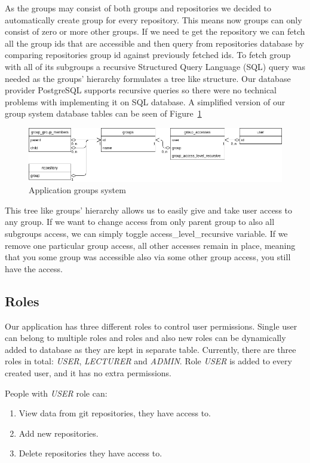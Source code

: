 As the groups may consist of both groups and repositories we decided to automatically create group for every repository.
This means now groups can only consist of zero or more other groups.
If we need te get the repository we can fetch all the group ids that are accessible and then query from repositories database by
comparing repositories group id against previously fetched ids.
To fetch group with all of its subgroups a recursive Structured Query Language (SQL) query was needed as the groups'
hierarchy formulates a tree like structure.
Our database provider PostgreSQL supports recursive queries so there were no technical problems with implementing it on SQL database.
A simplified version of our group system database tables can be seen of Figure~\ref{fig:group-system}

\begin{figure}[h]
    \includegraphics[width=\textwidth]{figures/group_system}
    \caption{Application groups system}
    \label{fig:group-system}
\end{figure}

This tree like groups' hierarchy allows us to easily give and take user access to any group.
If we want to change access from only parent group to also all subgroups access, we can simply toggle access{\_}level{\_}recursive
variable.
If we remove one particular group access, all other accesses remain in place, meaning that you some group was accessible
also via some other group access, you still have the access.

\subsection{Roles}\label{subsec:roles}
Our application has three different roles to control user permissions.
Single user can belong to multiple roles and roles and also new roles can be dynamically added to database as they are
kept in separate table.
Currently, there are three roles in total: \textit{USER}, \textit{LECTURER} and \textit{ADMIN}.
Role \textit{USER} is added to every created user, and it has no extra permissions.

People with \textit{USER} role can:
\begin{enumerate}
    \item View data from git repositories, they have access to.
    \item Add new repositories.
    \item Delete repositories they have access to.
\end{enumerate}

